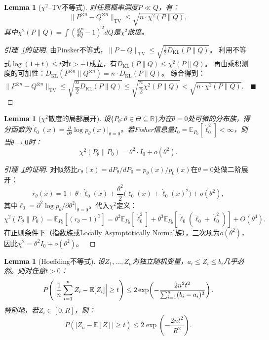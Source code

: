 \documentclass[12pt,a4paper]{article}
\newtheorem{lemma}[theorem]{Lemma}
\newcommand{\R}{\mathbb{R}}
\newcommand{\E}{\mathbb{E}}
\newcommand{\KL}{D_{\mathrm{KL}}}
\newcommand{\TV}{\mathrm{TV}}
\begin{document}
\begin{lemma}[$\chi^2$--TV不等式]
\label{lem:chi2-tv}
对任意概率测度$P \ll Q$，有：
\[
\|P^{\otimes n} - Q^{\otimes n}\|_{\TV} \leq \sqrt{n \cdot \chi^2(P\|Q)},
\]
其中$\chi^2(P\|Q) = \int (\frac{dP}{dQ} - 1)^2 dQ$是$\chi^2$散度。
\end{lemma}

\begin{proof}[引理~\ref{lem:chi2-tv}的证明]
由Pinsker不等式，$\|P-Q\|_{\TV} \leq \sqrt{\frac12 \KL(P\|Q)}$。
利用不等式$\log(1+t) \leq t$对$t>-1$成立，有$\KL(P\|Q) \leq \chi^2(P\|Q)$。
再由乘积测度的可加性：$\KL(P^{\otimes n}\|Q^{\otimes n}) = n \cdot \KL(P\|Q)$。
综合得到：
\[
\|P^{\otimes n} - Q^{\otimes n}\|_{\TV}
   \leq \sqrt{\frac{n}{2} \KL(P\|Q)}
   \leq \sqrt{\frac{n}{2} \chi^2(P\|Q)}
   < \sqrt{n \cdot \chi^2(P\|Q)}.
\quad\blacksquare
\]
\end{proof}

\begin{lemma}[$\chi^2$散度的局部展开]
\label{lem:chi2-local}
设$\{P_\theta: \theta \in \Theta \subseteq \R\}$为在$\theta=0$处可微的分布族，得分函数为$\dot{\ell}_0(x) = \frac{\partial}{\partial\theta} \log p_\theta(x)\big|_{\theta=0}$。若Fisher信息量$I_0 = \E_{P_0}[\dot{\ell}_0^2] < \infty$，则当$\theta \to 0$时：
\[
\chi^2(P_\theta \| P_0) = \theta^2 \cdot I_0 + o(\theta^2).
\]
\end{lemma}

\begin{proof}[引理~\ref{lem:chi2-local}的证明]
对似然比$r_\theta(x) = dP_\theta/dP_0 = p_\theta(x)/p_0(x)$在$\theta=0$处做二阶展开：
\[
r_\theta(x) = 1 + \theta \cdot \dot{\ell}_0(x) + \frac{\theta^2}{2} \bigl( \ddot{\ell}_0(x) + \dot{\ell}_0(x)^2 \bigr) + o(\theta^2),
\]
其中$\ddot{\ell}_0 = \partial^2 \log p_\theta/\partial\theta^2|_{\theta=0}$。代入$\chi^2$定义：
\[
\chi^2(P_\theta\|P_0) = \E_{P_0}[(r_\theta - 1)^2]
= \theta^2 \E_{P_0}[\dot{\ell}_0^2] + \theta^3 \E_{P_0}[\dot{\ell}_0(\ddot{\ell}_0 + \dot{\ell}_0^2)] + O(\theta^4).
\]
在正则条件下（指数族或Locally Asymptotically Normal族），三次项为$o(\theta^2)$，因此$\chi^2 = \theta^2 I_0 + o(\theta^2)$。~\blacksquare
\end{proof}

\begin{lemma}[Hoeffding不等式]
\label{lem:hoeffding}
设$Z_1, \ldots, Z_n$为独立随机变量，$a_i \leq Z_i \leq b_i$几乎必然。则对任意$t > 0$：
\[
P\!\left( \Bigl| \frac1n\sum_{i=1}^n Z_i - \E[Z_i] \Bigr| \geq t \right)
   \leq 2\exp\!\left( -\frac{2n^2 t^2}{\sum_{i=1}^n (b_i - a_i)^2} \right).
\]
特别地，若$Z_i \in [0, R]$，则：
\[
P\!\left( \bigl| \bar{Z}_n - \E[Z] \bigr| \geq t \right) \leq 2\exp\!\left( -\frac{2n t^2}{R^2} \right).
\]
\end{lemma}
\end{document}
